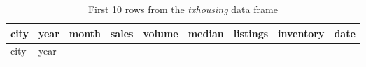 \documentclass[
  12pt,
  letterpaper,
  DIV=11,
  numbers=noendperiod]{scrreprt}
\begin{document}
\begin{longtable}[]{@{}
  >{\raggedright\arraybackslash}p{}
  >{\raggedleft\arraybackslash}p{}
  >{\raggedleft\arraybackslash}p{}
  >{\raggedleft\arraybackslash}p{}
  >{\raggedleft\arraybackslash}p{}
  >{\raggedleft\arraybackslash}p{}
  >{\raggedleft\arraybackslash}p{}
  >{\raggedleft\arraybackslash}p{}
  >{\raggedleft\arraybackslash}p{}@{}}
\caption{First 10 rows from the \emph{txhousing} data
frame}\label{tbl-txhousing-head-10}\tabularnewline
\toprule\noalign{}
\begin{minipage}[b]{\linewidth}\raggedright
city
\end{minipage} & \begin{minipage}[b]{\linewidth}\raggedleft
year
\end{minipage} & \begin{minipage}[b]{\linewidth}\raggedleft
month
\end{minipage} & \begin{minipage}[b]{\linewidth}\raggedleft
sales
\end{minipage} & \begin{minipage}[b]{\linewidth}\raggedleft
volume
\end{minipage} & \begin{minipage}[b]{\linewidth}\raggedleft
median
\end{minipage} & \begin{minipage}[b]{\linewidth}\raggedleft
listings
\end{minipage} & \begin{minipage}[b]{\linewidth}\raggedleft
inventory
\end{minipage} & \begin{minipage}[b]{\linewidth}\raggedleft
date
\end{minipage} \\
\midrule\noalign{}
\endfirsthead
\toprule\noalign{}
\begin{minipage}[b]{\linewidth}\raggedright
city
\end{minipage} & \begin{minipage}[b]{\linewidth}\raggedleft
year
\end{minipage} & \begin{minipage}[b]{\linewidth}\raggedleft

\end{minipage}
\end{longtable}
\end{document}
